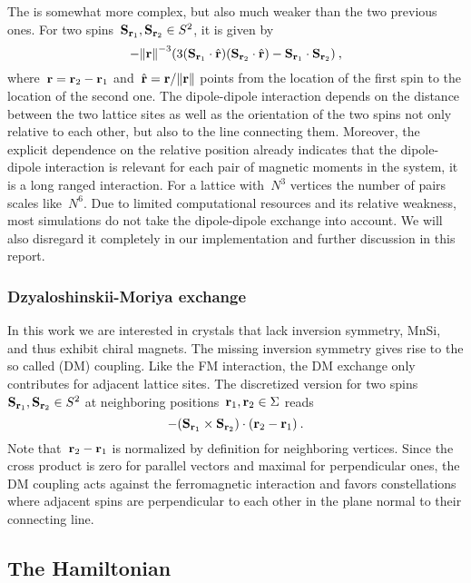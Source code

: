 The  is somewhat more complex, but also much
weaker than the two previous ones. For two spins~$\mathbf{S}_{\mathbf{r}_1}, \mathbf{S}_{\mathbf{r}_2} \in S^2$,
it is given by
%
\begin{equation}
  - {\norm{\r}^{-3}} (3 (\S_{\r_1} \cdot \hat{\r})
  (\S_{\r_2} \cdot \hat{\r}) - \S_{\r_1} \cdot \S_{\r_2})\:,
\end{equation}
%
where~$\mathbf{r} = \mathbf{r}_2 - \mathbf{r}_1$ and~$\hat{\r} = \r / \norm{\r}$ points from the
location of the first spin to the location of the second one. The dipole-dipole
interaction depends on the distance between the two lattice sites as well as the
orientation of the two spins not only relative to each other, but also to the
line connecting them. Moreover, the explicit dependence on the relative position
already indicates that the dipole-dipole interaction is relevant for each pair
of magnetic moments in the system, it is a long ranged interaction. For a
lattice with~$N^3$ vertices the number of pairs scales like~$N^6$. Due to
limited computational resources and its relative weakness, most simulations do
not take the dipole-dipole exchange into account. We will also disregard it
completely in our implementation and further discussion in this report.

\subsubsection{Dzyaloshinskii-Moriya exchange}

In this work we are interested in crystals that lack inversion symmetry, \eg{}
MnSi, and thus exhibit chiral magnets. The missing inversion symmetry gives rise
to the so called  (DM) coupling. Like the FM
interaction, the DM exchange only contributes for adjacent lattice sites. The
discretized version for two spins~$\mathbf{S}_{\mathbf{r}_1}, \mathbf{S}_{\mathbf{r}_2} \in S^2$ at neighboring
positions~$\mathbf{r}_1, \mathbf{r}_2 \in \Sigma$ reads
%
\begin{equation}
  - (\mathbf{S}_{\mathbf{r}_1} \times \mathbf{S}_{\mathbf{r}_2}) \cdot (\mathbf{r}_2 - \mathbf{r}_1)\:.
\end{equation}
%
Note that~$\mathbf{r}_2 - \mathbf{r}_1$ is normalized by definition for neighboring vertices.
Since the cross product is zero for parallel vectors and maximal for
perpendicular ones, the DM coupling acts against the ferromagnetic interaction
and favors constellations where adjacent spins are perpendicular to each other
in the plane normal to their connecting line.

\subsection{The Hamiltonian}

